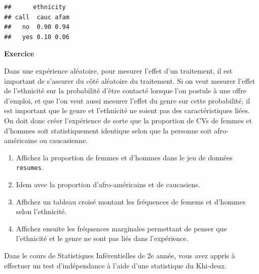 \documentclass[
  11pt,
]{book}
\newenvironment{Shaded}{\begin{snugshade}}{\end{snugshade}}
\newcommand{\AttributeTok}[1]{\textcolor[rgb]{0.13,0.29,0.53}{#1}}
\newcommand{\DecValTok}[1]{\textcolor[rgb]{0.00,0.00,0.81}{#1}}
\newcommand{\FunctionTok}[1]{\textcolor[rgb]{0.13,0.29,0.53}{\textbf{#1}}}
\newcommand{\NormalTok}[1]{#1}
\newcommand{\OtherTok}[1]{\textcolor[rgb]{0.56,0.35,0.01}{#1}}
\newcommand{\SpecialCharTok}[1]{\textcolor[rgb]{0.81,0.36,0.00}{\textbf{#1}}}
\providecommand{\tightlist}{%
  \setlength{\itemsep}{0pt}\setlength{\parskip}{0pt}}
\numberwithin{equation}{section}
\numberwithin{countremarque}{section}
\newenvironment{greenbox}{
  \begin{tcolorbox}[breakable, colback=vert,coltext=black,
                  colframe=grisfonce]}
 {\end{tcolorbox}}
\begin{document}
\begin{lstlisting}
##      ethnicity
## call  cauc afam
##   no  0.90 0.94
##   yes 0.10 0.06
\end{lstlisting}

\begin{greenbox}

\textbf{Exercice}

Dans une expérience aléatoire, pour mesurer l'effet d'un traitement, il est important de s'assurer du côté aléatoire du traitement. Si on veut mesurer l'effet de l'ethnicité sur la probabilité d'être contacté lorsque l'on postule à une offre d'emploi, et que l'on veut aussi mesurer l'effet du genre sur cette probabilité, il est important que le genre et l'ethnicité ne soient pas des caractéristiques liées. On doit donc créer l'expérience de sorte que la proportion de CVs de femmes et d'hommes soit statistiquement identique selon que la personne soit afro-américaine ou caucasienne.

\begin{enumerate}
\def\labelenumi{\arabic{enumi}.}
\tightlist
\item
  Affichez la proportion de femmes et d'hommes dans le jeu de données \texttt{resumes}.
\item
  Idem avec la proportion d'afro-américains et de caucasiens.
\item
  Affichez un tableau croisé montant les fréquences de femems et d'hommes selon l'ethnicité.
\item
  Affichez ensuite les fréquences marginales permettant de penser que l'ethnicité et le genre ne sont pas liés dans l'expérience.
\end{enumerate}

\end{greenbox}

Dans le cours de Statistiques Inférentielles de 2e année, vous avez appris à effectuer un test d'indépendance à l'aide d'une statistique du Khi-deux.

\begin{Shaded}
\end{Shaded}
\end{document}
